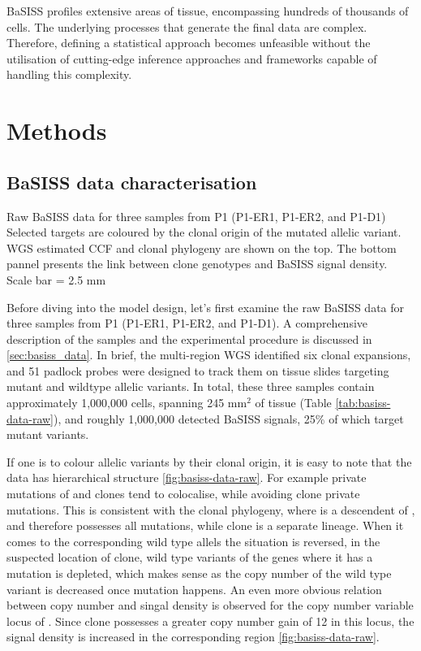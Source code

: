 \ac{BaSISS} profiles extensive areas of tissue, encompassing hundreds of thousands of cells. The underlying processes that generate the final data are complex. Therefore, defining a statistical approach becomes unfeasible without the utilisation of cutting-edge inference approaches and frameworks capable of handling this complexity.

\section{Methods}
\subsection{BaSISS data characterisation}
\label{sec:bassis-data-brief}

    {Raw \ac{BaSISS} data for three samples from P1 (P1-ER1, P1-ER2, and P1-D1)}
    {Selected targets are coloured by the clonal origin of the mutated allelic variant. \ac{WGS} estimated \acl{CCF} and clonal phylogeny are shown on the top. The bottom pannel presents the link between clone genotypes and \ac{BaSISS} signal density. Scale bar = 2.5 mm}

Before diving into the model design, let's first examine the raw \ac{BaSISS} data for three samples from P1 (P1-ER1, P1-ER2, and P1-D1). A comprehensive description of the samples and the experimental procedure is discussed in \cref{sec:basiss_data}. In brief, the multi-region \ac{WGS} identified six clonal expansions, and 51 padlock probes were designed to track them on tissue slides targeting mutant and wildtype allelic variants. In total, these three samples contain approximately 1,000,000 cells, spanning 245 mm\(^2\) of tissue (Table \cref{tab:basiss-data-raw}), and roughly 1,000,000 detected \ac{BaSISS} signals, 25\% of which target mutant variants.

If one is to colour allelic variants by their clonal origin, it is easy to note that the data has hierarchical structure \cref{fig:basiss-data-raw}. For example private mutations of  and  clones tend to colocalise, while avoiding  clone private mutations. This is consistent with the clonal phylogeny, where  is a descendent of , and therefore possesses all  mutations, while  clone is a separate lineage. When it comes to the corresponding wild type allels the situation is reversed, in the suspected location of  clone, wild type variants of the genes where it has a mutation is depleted, which makes sense as the copy number of the wild type variant is decreased once mutation happens. An even more obvious relation between copy number and singal density is observed for the copy number variable locus of . Since  clone possesses a greater copy number gain of 12 in this locus, the signal density is increased in the corresponding region \cref{fig:basiss-data-raw}. 

